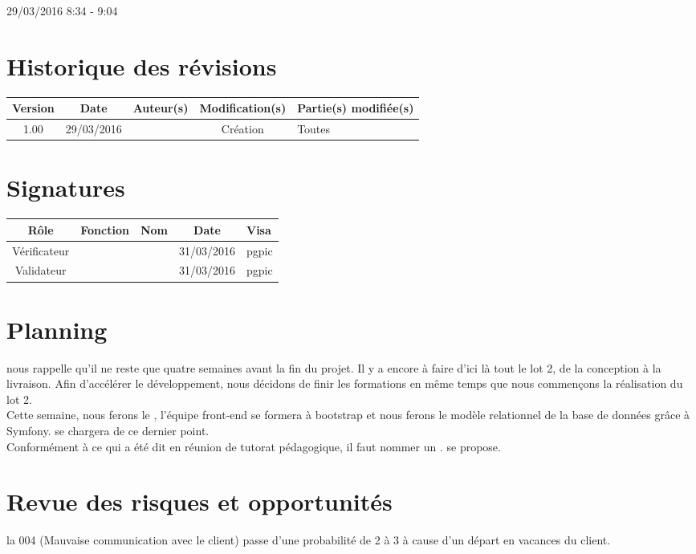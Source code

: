 \documentclass [a4paper] {article}
\begin{document}
29/03/2016			 				%
\hfill   
\hfill 	 8:34 - 9:04 				%



\section*{Historique des révisions}
\begin{center}
			\begin{tabular}{| c | c | c | c | p{4cm} |}
				\hline
				\rowcolor{Gray}
				Version & Date & Auteur(s) & Modification(s) & Partie(s) modifiée(s)		 \\
				\hline
				1.00 & 29/03/2016 & \Pierre & Création & Toutes \\
		\hline		
			\end{tabular}
		\end{center}

\section*{Signatures}

		\begin{center}
			\begin{tabular}{| c | c | c | c | p{4cm} |}
				\hline
				\rowcolor{Gray}
				Rôle & Fonction & Nom & Date & Visa		 \\
				\hline
				Vérificateur & \RQA & \Kafui & 31/03/2016 & pgpic \\[30pt]
				\hline
				Validateur & \CP & \Sergi & 31/03/2016 & pgpic \\[30pt]	
				\hline
			\end{tabular}
		\end{center}



\section{Planning}
\Sergi{} nous rappelle qu'il ne reste que quatre semaines avant la fin du projet. Il y a encore à faire d'ici là tout le lot 2, de la conception à la livraison. Afin d’accélérer le développement, nous décidons de finir les formations en même temps que nous commençons la réalisation du lot 2. \\
Cette semaine, nous ferons le \DCP{}, l'équipe front-end se formera à bootstrap et nous ferons le modèle relationnel de la base de données grâce à Symfony. \Kafui{} se chargera de ce dernier point. \\
Conformément à ce qui a été dit en réunion de tutorat pédagogique, il faut nommer un \RS{}. \Florian{} se propose.


\section{Revue des risques et opportunités}

la \FDR{} 004 (Mauvaise communication avec le client) passe d'une probabilité de 2 à 3 à cause d'un départ en vacances du client.

\end{document}
